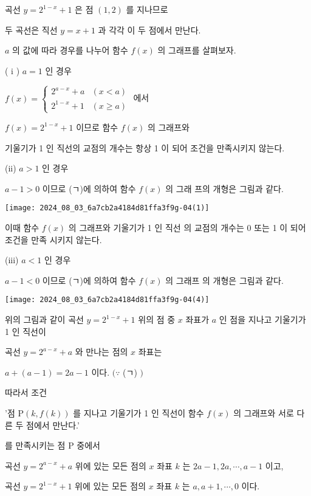 \documentclass[10pt]{article}
\begin{document}
곡선 \(y=2^{1-x}+1\) 은 점 \((1,2)\) 를 지나므로

두 곡선은 직선 \(y=x+1\) 과 각각 이 두 점에서 만난다.

\(a\) 의 값에 따라 경우를 나누어 함수 \(f(x)\) 의 그래프를 살펴보자.

( i ) \(a=1\) 인 경우

\(f(x)=\left\{\begin{array}{ll}2^{a-x}+a & (x<a) \\ 2^{1-x}+1 & (x \geq a)\end{array}\right.\) 에서

\(f(x)=2^{1-x}+1\) 이므로 함수 \(f(x)\) 의 그래프와

기울기가 1 인 직선의 교점의 개수는 항상 1 이 되어 조건을 만족시키지 않는다.

(ii) \(a>1\) 인 경우

\(a-1>0\) 이므로 (ㄱ)에 의하여 함수 \(f(x)\) 의 그래 프의 개형은 그림과 같다.

\begin{center}
\texttt{[image: 2024\_08\_03\_6a7cb2a4184d81ffa3f9g-04(1)]}
\end{center}

이때 함수 \(f(x)\) 의 그래프와 기울기가 1 인 직선 의 교점의 개수는 0 또는 1 이 되어 조건을 만족 시키지 않는다.

(iii) \(a<1\) 인 경우

\(a-1<0\) 이므로 (ㄱ)에 의하여 함수 \(f(x)\) 의 그래프 의 개형은 그림과 같다.

\begin{center}
\texttt{[image: 2024\_08\_03\_6a7cb2a4184d81ffa3f9g-04(4)]}
\end{center}

위의 그림과 같이 곡선 \(y=2^{1-x}+1\) 위의 점 중 \(x\) 좌표가 \(a\) 인 점을 지나고 기울기가 1 인 직선이

곡선 \(y=2^{a-x}+a\) 와 만나는 점의 \(x\) 좌표는

\(a+(a-1)=2 a-1\) 이다. \((\because\) (ㄱ) \()\)

따라서 조건

'점 \(\mathrm{P}(k, f(k))\) 를 지나고 기울기가 1 인 직선이 함수 \(f(x)\) 의 그래프와 서로 다른 두 점에서 만난다.'

를 만족시키는 점 P 중에서

곡선 \(y=2^{a-x}+a\) 위에 있는 모든 점의 \(x\) 좌표 \(k\) 는 \(2 a-1,2 a, \cdots, a-1\) 이고,

곡선 \(y=2^{1-x}+1\) 위에 있는 모든 점의 \(x\) 좌표 \(k\) 는 \(a, a+1, \cdots, 0\) 이다.
\end{document}
